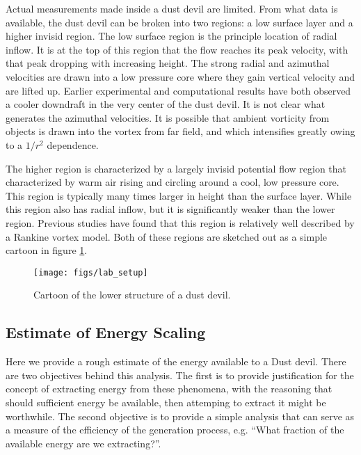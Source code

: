 Actual measurements made inside a dust devil are limited. From what data
is available, the dust devil can be broken into two regions: a low surface 
layer and a higher invisid region. The low surface region is the 
principle location of radial inflow. 
It is at the top of this region that the flow 
reaches its peak velocity, with that peak dropping with increasing height. 
The strong radial and azimuthal velocities are drawn into a low pressure core 
where they gain vertical velocity and are lifted up. Earlier experimental and 
computational results have both observed a cooler downdraft in the very center 
of the dust devil. It is not clear what generates the azimuthal velocities. It is 
possible that ambient vorticity from objects is drawn into the vortex from far 
field, and which intensifies greatly owing to a $1/r^2$ dependence.

The higher region is characterized by a largely invisid potential flow region 
that characterized by warm air rising and circling around a cool, 
low pressure core. This region is typically many times larger in height than the
surface layer. While this region also has radial inflow, but it is 
significantly weaker than the lower region. Previous studies have found that
this region is relatively well described by a Rankine vortex model\cite{}. 
Both of these regions are sketched out as a simple 
cartoon in figure \ref{fig:cartoon}. 

  \begin{figure}[!htb]
    \begin{center}
     \texttt{[image: figs/lab\_setup]}
     \caption{Cartoon of the lower structure of a dust devil.}
     \label{fig:cartoon}
    \end{center}
  \end{figure}


\subsection{Estimate of Energy Scaling}

Here we provide a rough estimate of the energy
available to a Dust devil. There are two objectives behind this
analysis. The first is to provide justification for the concept of
extracting energy from these phenomena, with the reasoning that should
sufficient energy be available, then attemping to extract it might be
worthwhile. The second objective is to provide a simple analysis that
can serve as a measure of the efficiency of the generation process,
e.g. ``What fraction of the available energy are we extracting?''.  

